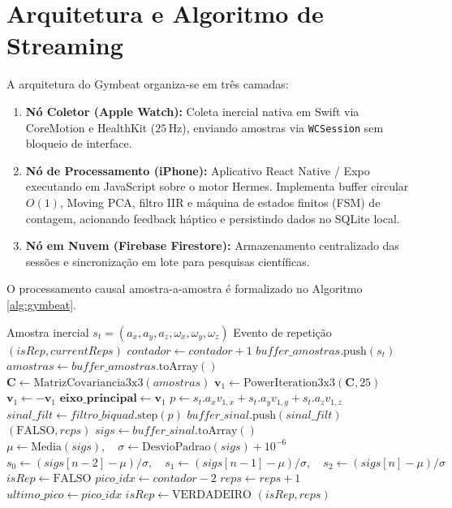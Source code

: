 \documentclass[12pt]{article}
\begin{document}
\section{Arquitetura e Algoritmo de Streaming}

A arquitetura do Gymbeat organiza-se em três camadas:
\begin{enumerate}
    \item \textbf{Nó Coletor (Apple Watch):} Coleta inercial nativa em Swift via CoreMotion e HealthKit ($25\,$Hz), enviando amostras via \texttt{WCSession} sem bloqueio de interface.
    \item \textbf{Nó de Processamento (iPhone):} Aplicativo React Native / Expo executando em JavaScript sobre o motor Hermes. Implementa buffer circular $O(1)$, Moving PCA, filtro IIR e máquina de estados finitos (FSM) de contagem, acionando feedback háptico e persistindo dados no SQLite local.
    \item \textbf{Nó em Nuvem (Firebase Firestore):} Armazenamento centralizado das sessões e sincronização em lote para pesquisas científicas.
\end{enumerate}

O processamento causal amostra-a-amostra é formalizado no Algoritmo \ref{alg:gymbeat}.

\begin{algorithm}[H]
\caption{Processamento em Tempo Real Gymbeat}
\label{alg:gymbeat}
\begin{algorithmic}[1]
\REQUIRE Amostra inercial $s_t = (a_x, a_y, a_z, \omega_x, \omega_y, \omega_z)$
\ENSURE Evento de repetição $(isRep, currentReps)$
\STATE $contador \leftarrow contador + 1$
\STATE $buffer\_amostras.\text{push}(s_t)$
\STATE $amostras \leftarrow buffer\_amostras.\text{toArray}()$
    \STATE $\mathbf{C} \leftarrow \text{MatrizCovariancia3x3}(amostras)$
    \STATE $\mathbf{v}_1 \leftarrow \text{PowerIteration3x3}(\mathbf{C}, 25)$
        \STATE $\mathbf{v}_1 \leftarrow -\mathbf{v}_1$
    \ENDIF
    \STATE $\mathbf{eixo\_principal} \leftarrow \mathbf{v}_1$
\ENDIF
\STATE $p \leftarrow s_t.a_x v_{1,x} + s_t.a_y v_{1,y} + s_t.a_z v_{1,z}$
\STATE $sinal\_filt \leftarrow filtro\_biquad.\text{step}(p)$
\STATE $buffer\_sinal.\text{push}(sinal\_filt)$
    \RETURN $(\text{FALSO}, reps)$
\ENDIF
\STATE $sigs \leftarrow buffer\_sinal.\text{toArray}()$
\STATE $\mu \leftarrow \text{Media}(sigs), \quad \sigma \leftarrow \text{DesvioPadrao}(sigs) + 10^{-6}$
\STATE $s_0 \leftarrow (sigs[n-2] - \mu)/\sigma, \quad s_1 \leftarrow (sigs[n-1] - \mu)/\sigma, \quad s_2 \leftarrow (sigs[n] - \mu)/\sigma$
\STATE $isRep \leftarrow \text{FALSO}$
    \STATE $pico\_idx \leftarrow contador - 2$
        \STATE $reps \leftarrow reps + 1$
        \STATE $ultimo\_pico \leftarrow pico\_idx$
        \STATE $isRep \leftarrow \text{VERDADEIRO}$
    \ENDIF
\ENDIF
\RETURN $(isRep, reps)$
\end{algorithmic}
\end{algorithm}
\end{document}
